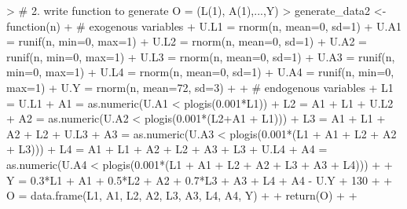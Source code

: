 \documentclass[answers]{exam}
\begin{document}
\begin{solution}

\begin{Schunk}
\end{Schunk}

\begin{Schunk}
\begin{Sinput}
> # 2. write function to generate O = (L(1), A(1),...,Y)
> generate_data2 <- function(n){
+   # exogenous variables
+   U.L1 = rnorm(n, mean=0, sd=1)
+   U.A1 = runif(n, min=0, max=1)
+   U.L2 = rnorm(n, mean=0, sd=1)
+   U.A2 = runif(n, min=0, max=1)
+   U.L3 = rnorm(n, mean=0, sd=1)
+   U.A3 = runif(n, min=0, max=1)
+   U.L4 = rnorm(n, mean=0, sd=1)
+   U.A4 = runif(n, min=0, max=1)
+   U.Y = rnorm(n, mean=72, sd=3)
+   
+   # endogenous variables
+   L1 = U.L1
+   A1 = as.numeric(U.A1 < plogis(0.001*L1))
+   L2 = A1 + L1 + U.L2
+   A2 = as.numeric(U.A2 < plogis(0.001*(L2+A1 + L1)))
+   L3 = A1 + L1 + A2 + L2 + U.L3
+   A3 = as.numeric(U.A3 < plogis(0.001*(L1 + A1 + L2 + A2 + L3)))
+   L4 = A1 + L1 + A2 + L2 + A3 + L3 + U.L4
+   A4 = as.numeric(U.A4 < plogis(0.001*(L1 + A1 + L2 + A2 + L3 + A3 + L4))) 
+   
+   Y = 0.3*L1 + A1 + 0.5*L2 + A2 + 0.7*L3 + A3 + L4 + A4 - U.Y + 130
+   
+   O = data.frame(L1, A1, L2, A2, L3, A3, L4, A4, Y)
+   
+   return(O)
+   
+ }
\end{Sinput}
\end{Schunk}

\begin{Schunk}
\end{Schunk}


\end{solution}
\end{document}
